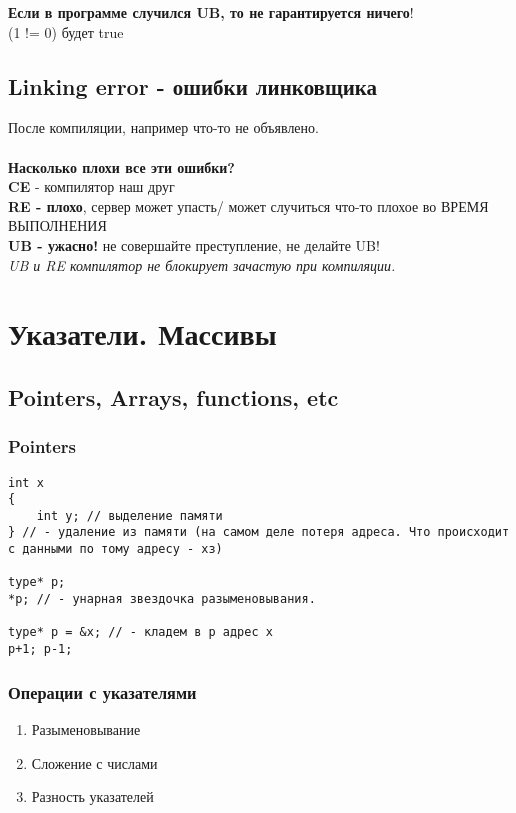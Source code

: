 \documentclass[12pt, a5paper]{article}
\begin{document}
\textbf{Если в программе случился UB, то не гарантируется ничего}! 
\\

	(1 != 0) будет true


\subsection{Linking error - ошибки линковщика}

После компиляции, например что-то не объявлено.
\\
\\
\textbf{Насколько плохи все эти ошибки?} 
\\
\textbf{CE} - компилятор наш друг
\\
\textbf{RE - плохо}, сервер может упасть/ может случиться что-то плохое во ВРЕМЯ ВЫПОЛНЕНИЯ
\\
\textbf{UB - ужасно!} не совершайте преступление, не делайте UB!
\\
\textit{UB и RE компилятор не блокирует зачастую при компиляции.
}
\section{Указатели. Массивы}
\subsection{Pointers, Arrays, functions, etc}
\subsubsection{Pointers}

\begin{lstlisting}
int x
{
	int y; // выделение памяти
} // - удаление из памяти (на самом деле потеря адреса. Что происходит с данными по тому адресу - хз)

type* p; 
*p; // - унарная звездочка разыменовывания.

type* p = &x; // - кладем в p адрес x
p+1; p-1;
\end{lstlisting}

\subsubsection{Операции с указателями}
\begin{enumerate}
\item Разыменовывание
\item Сложение с числами
\item Разность указателей
\end{enumerate}
\end{document}
